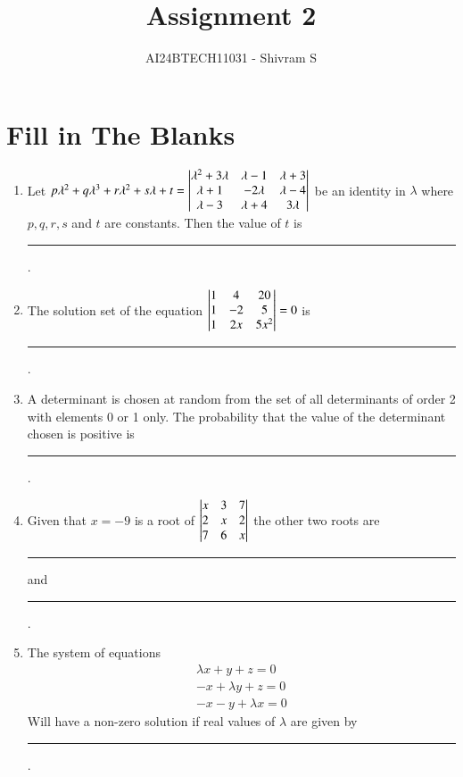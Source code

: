 \documentclass[journal,12pt,twocolumn]{IEEEtran}
\theoremstyle{remark}
\begin{document}


\title{Assignment 2}
\author{AI24BTECH11031 - Shivram S}
\maketitle
\newpage
\bigskip

\renewcommand{\thefigure}{\theenumi}
\renewcommand{\thetable}{\theenumi}

\section{Fill in The Blanks}
\begin{enumerate}[label=\arabic*.]
	\item Let $p\lambda^2 + q\lambda^3 + r\lambda^2 + s\lambda + t =
		\begin{vmatrix}
			\lambda^2 + 3\lambda & \lambda - 1 & \lambda + 3 \\
			\lambda + 1 & -2\lambda & \lambda - 4 \\
			\lambda - 3 & \lambda+ 4 & 3\lambda
		\end{vmatrix}$ be an identity in $\lambda$ where $p, q, r, s$ and $t$ are constants.
		Then the value of $t$ is \rule{1cm}{0.15mm}.
		\hfill {}
	
	\item The solution set of the equation $\begin{vmatrix}
			1 & 4 & 20 \\
			1 & -2 & 5 \\
			1 & 2x & 5x^2
		\end{vmatrix} = 0$ is \rule{1cm}{0.15mm}.
		\hfill {}

	\item A determinant is chosen at random from the set of all determinants of order
		2 with elements 0 or 1 only. The probability that the value of the determinant
		chosen is positive is \rule{1cm}{0.15mm}.
		\hfill {}

	\item Given that $x = -9$ is a root of $\begin{vmatrix}
			x & 3 & 7 \\
			2 & x & 2 \\
			7 & 6 & x
		\end{vmatrix}$ the other two roots are \rule{1cm}{0.15mm} and \rule{1cm}{0.15mm}.
		\hfill {}

	\item The system of equations
		\begin{gather*}
			\lambda x + y + z = 0 \\
			-x + \lambda y + z = 0 \\
			-x - y + \lambda x = 0
		\end{gather*}
		Will have a non-zero solution if real values of $\lambda$ are given by
		\rule{1cm}{0.15mm}.
		\hfill {}


\end{enumerate}
\end{document}
